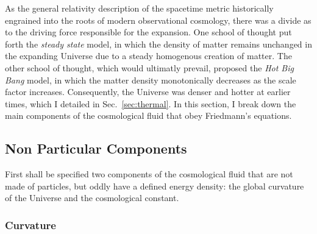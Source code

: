 \vspace*{1.5pc}

As the general relativity description of the spacetime metric historically engrained into the roots of modern observational cosmology, there was a divide as to the driving force responsible for the expansion. One school of thought put forth the \emph{steady state} model, in which the density of matter remains unchanged in the expanding Universe due to a steady homogenous creation of matter. The other school of thought, which would ultimatly prevail, proposed the \emph{Hot Big Bang} model, in which the matter density monotonically decreases as the scale factor increases. Consequently, the Universe was denser and hotter at earlier times, which I detailed in Sec.~\ref{sec:thermal}. In this section, I break down the main components of the cosmological fluid that obey Friedmann's equations. 


\subsection{Non Particular Components}

First shall be specified two components of the cosmological fluid that are not made of particles, but oddly have a defined energy density: the global curvature of the Universe and the cosmological constant. 

\subsubsection{Curvature}

